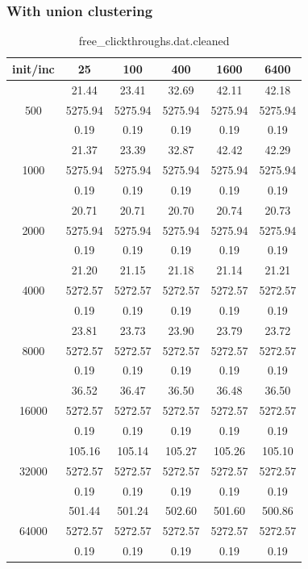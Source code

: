 {\subsubsection{With union clustering}
\begin{table}[th]
\caption{free\_clickthroughs.dat.cleaned}
\label{tab:free_clickthroughs.dat.cleaned}
\centering
\begin{tabular}{|c||c|c|c|c|c|}
\hline
init/inc & 25 & 100 & 400 & 1600 & 6400 \\ \hline \hline
  & 21.44 & 23.41 & 32.69 & 42.11 & 42.18\\ 
500  & 5275.94 & 5275.94 & 5275.94 & 5275.94 & 5275.94\\ 
  & 0.19 & 0.19 & 0.19 & 0.19 & 0.19\\ \hline 
  & 21.37 & 23.39 & 32.87 & 42.42 & 42.29\\ 
1000  & 5275.94 & 5275.94 & 5275.94 & 5275.94 & 5275.94\\ 
  & 0.19 & 0.19 & 0.19 & 0.19 & 0.19\\ \hline 
  & 20.71 & 20.71 & 20.70 & 20.74 & 20.73\\ 
2000  & 5275.94 & 5275.94 & 5275.94 & 5275.94 & 5275.94\\ 
  & 0.19 & 0.19 & 0.19 & 0.19 & 0.19\\ \hline 
  & 21.20 & 21.15 & 21.18 & 21.14 & 21.21\\ 
4000  & 5272.57 & 5272.57 & 5272.57 & 5272.57 & 5272.57\\ 
  & 0.19 & 0.19 & 0.19 & 0.19 & 0.19\\ \hline 
  & 23.81 & 23.73 & 23.90 & 23.79 & 23.72\\ 
8000  & 5272.57 & 5272.57 & 5272.57 & 5272.57 & 5272.57\\ 
  & 0.19 & 0.19 & 0.19 & 0.19 & 0.19\\ \hline 
  & 36.52 & 36.47 & 36.50 & 36.48 & 36.50\\ 
16000  & 5272.57 & 5272.57 & 5272.57 & 5272.57 & 5272.57\\ 
  & 0.19 & 0.19 & 0.19 & 0.19 & 0.19\\ \hline 
  & 105.16 & 105.14 & 105.27 & 105.26 & 105.10\\ 
32000  & 5272.57 & 5272.57 & 5272.57 & 5272.57 & 5272.57\\ 
  & 0.19 & 0.19 & 0.19 & 0.19 & 0.19\\ \hline 
  & 501.44 & 501.24 & 502.60 & 501.60 & 500.86\\ 
64000  & 5272.57 & 5272.57 & 5272.57 & 5272.57 & 5272.57\\ 
  & 0.19 & 0.19 & 0.19 & 0.19 & 0.19\\ \hline 
\end{tabular}
\end{table}

}
